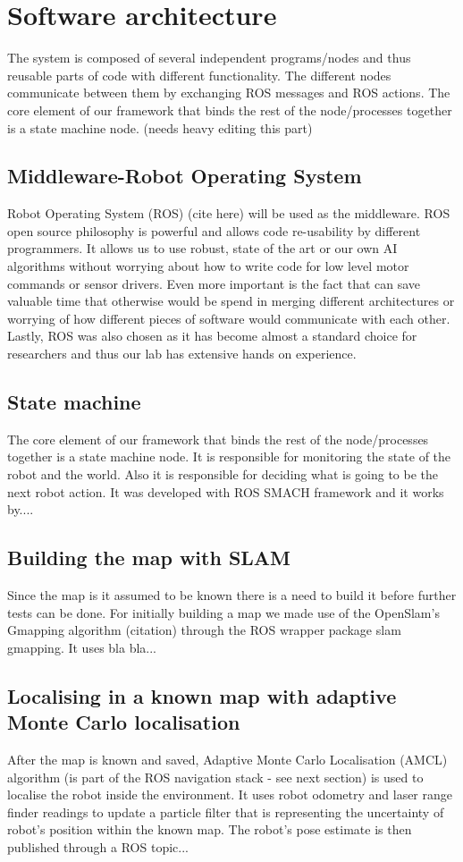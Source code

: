 \documentclass[conference]{IEEEtran}
\begin{document}
\section{Software architecture}
The system is composed of several independent programs/nodes and thus reusable parts of code with different functionality.  The different nodes communicate between them by exchanging ROS messages and ROS actions. The core element of our framework that binds the rest of the node/processes together is a state machine node. (needs heavy editing this part)

\subsection{Middleware-Robot Operating System}
Robot Operating System (ROS) (cite here) will be used as the middleware. ROS open source philosophy is powerful and allows code re-usability by different programmers. It allows us to use robust, state of the art or our own AI algorithms without worrying about how to write code for low level motor commands or sensor drivers. Even more important is the fact that can save valuable time that otherwise would be spend in merging different architectures or worrying of how different pieces of software would communicate with each other. Lastly, ROS was also chosen as it has become almost a standard choice for researchers and thus our lab has extensive hands on experience.

\subsection{State machine}
The core element of our framework that binds the rest of the node/processes together is a state machine node. It is responsible for monitoring the state of the robot and the world. Also it is responsible for deciding what is going to be the next robot action. It was developed with ROS SMACH framework and it works by....

\subsection{Building the map with SLAM}
Since the map is it assumed to be known there is a need to build it before further tests can be done. For initially building a map we made use of the OpenSlam's Gmapping algorithm (citation) through the ROS wrapper package slam gmapping. It uses bla bla...

\subsection{Localising in a known map with adaptive Monte Carlo localisation}
After the map is known and saved, Adaptive Monte Carlo Localisation (AMCL) algorithm (is part of the ROS navigation stack - see next section) is used to localise the robot inside the environment. It uses robot odometry and laser range finder readings to update a particle filter that is representing the uncertainty of robot's position within the known map. The robot's pose estimate is then published through a ROS topic...
\end{document}
